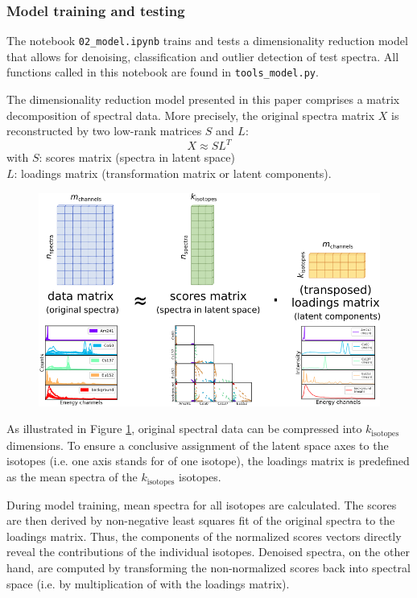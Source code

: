 \documentclass[preprint,12pt, a4paper]{elsarticle}
\begin{document}
\subsubsection{Model training and testing}
The notebook \texttt{02\_model.ipynb} trains and tests a dimensionality reduction model that allows for denoising, classification and outlier detection of test spectra. All functions called in this notebook are found in \texttt{tools\_model.py}.

The dimensionality reduction model presented in this paper comprises a matrix decomposition of spectral data. More precisely, the original spectra matrix $X$ is reconstructed by two low-rank matrices $S$ and $L$:  
$$ X \approx S  L^{T} $$  
with $S$: scores matrix (spectra in latent space) \\  
\hspace*{0.8cm} $L$: loadings matrix (transformation matrix or latent components). \\ 

\begin{figure}
\includegraphics[width=\textwidth]{figure_1.png}
\label{fig:matrix_decomposition}
\end{figure}

As illustrated in Figure \ref{fig:matrix_decomposition}, original spectral data can be compressed into $k_\mathrm{isotopes}$ dimensions. To ensure a conclusive assignment of the latent space axes to the isotopes (i.e. one axis stands for of one isotope), the loadings matrix is predefined as the mean spectra of the $k_\mathrm{isotopes}$ isotopes. 

During model training, mean spectra for all isotopes are calculated. The scores are then derived by non-negative least squares fit of the original spectra to the loadings matrix. Thus, the components of the normalized scores vectors directly reveal the contributions of the individual isotopes. Denoised spectra, on the other hand, are computed by transforming the non-normalized scores back into spectral space (i.e. by multiplication of with the loadings matrix).
\end{document}
